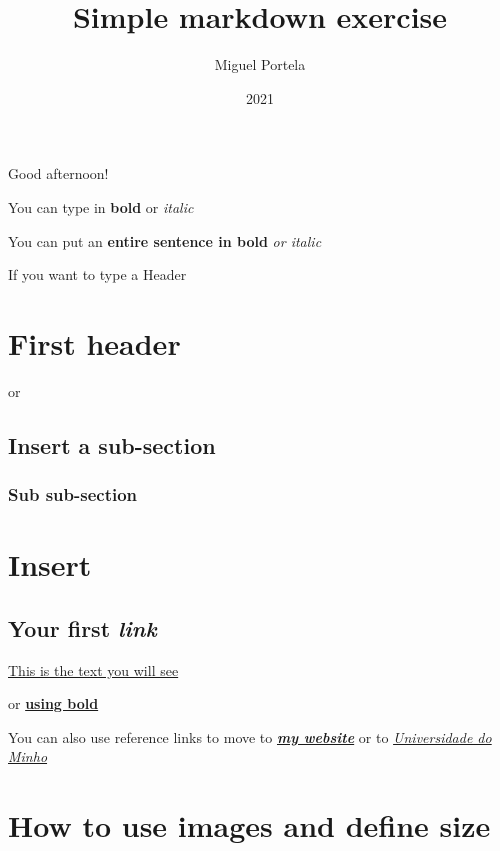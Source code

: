 \documentclass[
]{article}
\title{Simple markdown exercise}
\author{Miguel Portela}
\date{2021}
\begin{document}
\maketitle

Good afternoon!

You can type in \textbf{bold} or \emph{italic}

You can put an \textbf{entire sentence in bold} \emph{or italic}

If you want to type a Header

\hypertarget{first-header}{%
\section{First header}\label{first-header}}

or

\hypertarget{insert-a-sub-section}{%
\subsection{Insert a sub-section}\label{insert-a-sub-section}}

\hypertarget{sub-sub-section}{%
\subsubsection{Sub sub-section}\label{sub-sub-section}}

\hypertarget{insert}{%
\section{Insert}\label{insert}}

\hypertarget{your-first-link}{%
\subsection{\texorpdfstring{Your first
\emph{link}}{Your first link}}\label{your-first-link}}

\href{https://www.markdowntutorial.com/}{This is the text you will see}

or \href{https://www.markdowntutorial.com/}{\textbf{using bold}}

You can also use reference links to move to
\href{http://www1.eeg.uminho.pt/economia/mangelo/}{\emph{\textbf{my
website}}} or to \href{https://www.uminho.pt/EN/}{\emph{Universidade do
Minho}}

\hypertarget{how-to-use-images-and-define-size}{%
\section{How to use images and define
size}\label{how-to-use-images-and-define-size}}
\end{document}
